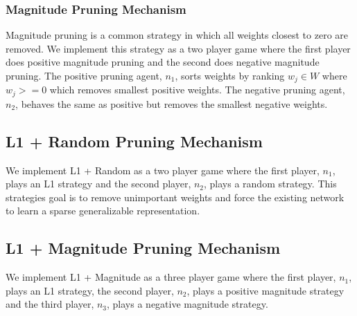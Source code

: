 \documentclass[runningheads]{llncs}
\begin{document}
\subsubsection{Magnitude Pruning Mechanism}
Magnitude pruning is a common strategy in which all weights closest to zero are removed. We implement this strategy as a two player game where the first player does positive magnitude pruning and the second does negative magnitude pruning. The positive pruning agent, $n_1$, sorts weights by ranking $w_j \in W$ where $w_j >= 0$ which removes smallest positive weights. The negative pruning agent, $n_2$, behaves the same as positive but removes the smallest negative weights.
\subsection{L1 + Random Pruning Mechanism}
We implement L1 + Random as a two player game where the first player, $n_1$, plays an L1 strategy and the second player, $n_2$, plays a random strategy. This strategies goal is to remove unimportant weights and force the existing network to learn a sparse generalizable representation.
\subsection{L1 + Magnitude Pruning Mechanism}
We implement L1 + Magnitude as a three player game where the first player, $n_1$, plays an L1 strategy, the second player, $n_2$, plays a positive magnitude strategy and the third player, $n_3$, plays a negative magnitude strategy.
\end{document}
